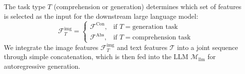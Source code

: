 The task type $T$ (comprehension or generation) determines which set of features is selected as the input for the downstream large language model:
\begin{equation}
    \mathcal{F}^{\text{img}}_T =
    \begin{cases}
        \mathcal{F}^{\text{Con}}, & \text{if } T = \text{generation task} \\
        \mathcal{F}^{\text{Abs}}, & \text{if } T = \text{comprehension task}
    \end{cases}
\end{equation}
We integrate the image features $\mathcal{F}^{\text{img}}_T$ and text features $\mathcal{T}$ into a joint sequence through simple concatenation, which is then fed into the LLM $\mathcal{M}_{\text{llm}}$ for autoregressive generation.
